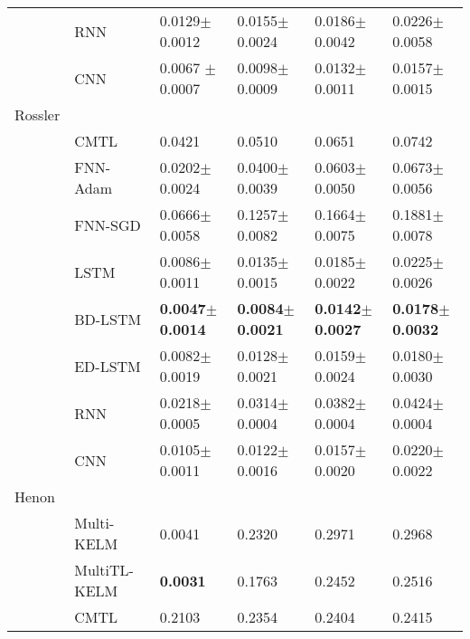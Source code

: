 \documentclass{ieeeaccess}
\begin{document}
\begin{table*}[htbp!]
\begin{tabular}{llllll}
&RNN  &   0.0129$\pm$	0.0012   	& 0.0155$\pm$	0.0024       &0.0186$\pm$	0.0042	       &0.0226$\pm$	0.0058\\

&CNN &  	0.0067	$\pm$0.0007    	&  0.0098$\pm$	0.0009      &0.0132$\pm$	0.0011	       &0.0157$\pm$	0.0015\\
\hline



 
Rossler &    	  &	& \\

&CMTL \cite{chandra2017CMTLMulti} & 0.0421   & 0.0510  &0.0651	& 0.0742 	   \\


&FNN-Adam & 0.0202$\pm$	0.0024     	&  0.0400$\pm$	0.0039      &0.0603$\pm$	0.0050	       &0.0673$\pm$	0.0056\\

&FNN-SGD  &  0.0666$\pm$	0.0058    	& 0.1257$\pm$	0.0082       &0.1664$\pm$	0.0075	       &0.1881$\pm$	0.0078\\

&LSTM   &  0.0086$\pm$	0.0011    	&  0.0135$\pm$	0.0015      &0.0185$\pm$	0.0022	       &0.0225$\pm$	0.0026\\

&BD-LSTM   &  \textbf{0.0047$\pm$	0.0014}    	& \textbf{ 0.0084$\pm$	0.0021 }     &	\textbf{0.0142$\pm$	0.0027 }      &\textbf{0.0178$\pm$	0.0032}\\

&ED-LSTM   &  0.0082$\pm$	0.0019    	&   0.0128$\pm$	0.0021     &0.0159$\pm$	0.0024	       &0.0180$\pm$	0.0030\\

&RNN  &    0.0218$\pm$	0.0005  	&   0.0314$\pm$	0.0004     &0.0382$\pm$	0.0004	       &0.0424$\pm$	0.0004\\

&CNN & 0.0105$\pm$		0.0011     	&  0.0122$\pm$		0.0016      &	0.0157$\pm$		0.0020	       &	0.0220$\pm$		0.0022\\
\hline


 
 
 
 

 
 
Henon &    	  & 	& \\
&Multi-KELM\cite{YE2019227}&0.0041&	0.2320&	0.2971&	0.2968\\
&MultiTL-KELM\cite{YE2019227}&	 \textbf{0.0031}&	0.1763&0.2452&	0.2516\\
&CMTL \cite{chandra2017CMTLMulti} & 0.2103   & 0.2354  &0.2404	   & 0.2415 \\



\end{tabular}
\end{table*}
\end{document}
